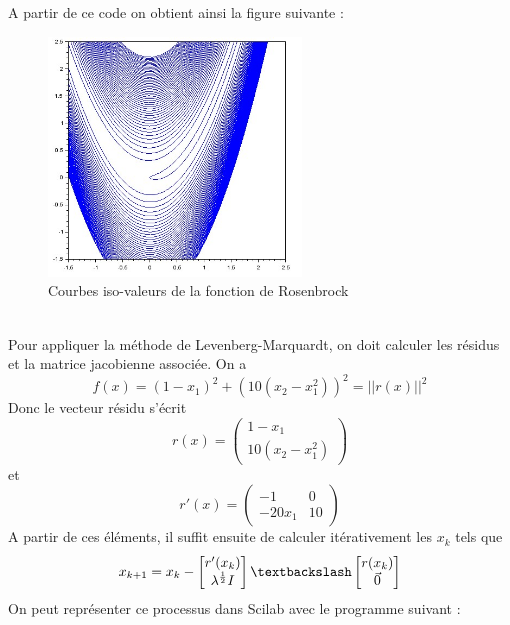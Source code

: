          A partir de ce code on obtient ainsi la figure suivante : 
         \begin{figure}[h]
              \centering
              \captionsetup{font=small}
                \includegraphics[width=0.6\textwidth]{images/rosenbrock.jpg}
              \caption{Courbes iso-valeurs de la fonction de Rosenbrock}
              \label{fig:LM1}
            \end{figure}
            \\
        Pour appliquer la méthode de Levenberg-Marquardt, on doit calculer les résidus et la matrice jacobienne associée. On a $$
        f(x)=(1-x_1)^2+(10(x_2-x_1^2))^2 = ||r(x)||^2
        $$
        Donc le vecteur résidu s'écrit 
        $$
        r(x) = \begin{pmatrix}
            1-x_1\\10(x_2-x_1^2)
        \end{pmatrix}
        $$
        et
        $$
        r'(x) = \begin{pmatrix}
            -1&0\\-20x_1&10
        \end{pmatrix}
        $$
        A partir de ces éléments, il suffit ensuite de calculer itérativement les $x_k$ tels que 
        $$
        x_{k+1} = x_k - \begin{bmatrix}
            r'(x_k)\\\lambda^{\frac{1}{2}}I
        \end{bmatrix}\textbackslash\begin{bmatrix}
            r(x_k)\\ \Vec{0}
        \end{bmatrix}
        $$
        On peut représenter ce processus dans Scilab avec le programme suivant : 
